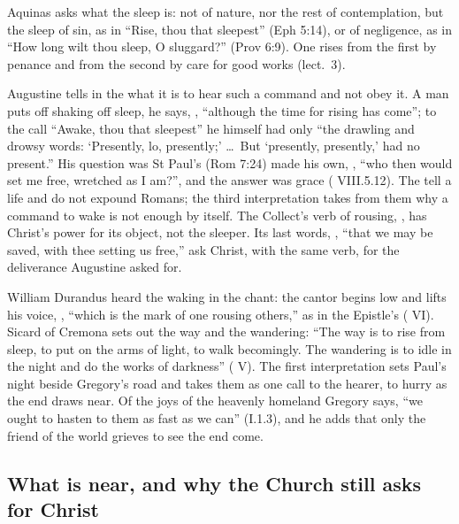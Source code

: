 Aquinas asks what the sleep is: not of nature, nor the rest of contemplation,
but the sleep of sin, as in ``Rise, thou that sleepest'' (Eph 5:14), or of
negligence, as in ``How long wilt thou sleep, O sluggard?'' (Prov 6:9). One
rises from the first by penance and from the second by care for good works
(lect.~3).

Augustine tells in the  what it is to hear such a command
and not obey it. A man puts off shaking off sleep, he says, , ``although the time for rising has come''; to the
call ``Awake, thou that sleepest'' he himself had only ``the drawling and
drowsy words: `Presently, lo, presently;' \dots\ But `presently, presently,'
had no present.'' His question was St Paul's (Rom 7:24) made his own,
, ``who then would set me free,
wretched as I am?'', and the answer was grace ( VIII.5.12).
The  tell a life and do not expound Romans; the third
interpretation takes from them why a command to wake is not enough by itself.
The Collect's verb of rousing, , has Christ's power for its
object, not the sleeper. Its last words,
, ``that we may be saved, with thee setting us
free,'' ask Christ, with the same verb, for the deliverance Augustine asked
for.

William Durandus heard the waking in the chant: the cantor begins
 low and lifts his voice, , ``which is the mark of one rousing others,'' as in the Epistle's
 ( VI). Sicard of Cremona sets out the way and
the wandering: ``The way is to rise from sleep, to put on the arms of light,
to walk becomingly. The wandering is to idle in the night and do the works of
darkness'' ( V). The first interpretation sets Paul's night
beside Gregory's road and takes them as one call to the hearer, to hurry as the
end draws near. Of the joys of the heavenly homeland Gregory says, ``we ought
to hasten to them as fast as we can'' (I.1.3), and he adds that only the friend
of the world grieves to see the end come.

\subsection{What is near, and why the Church still asks for Christ}


